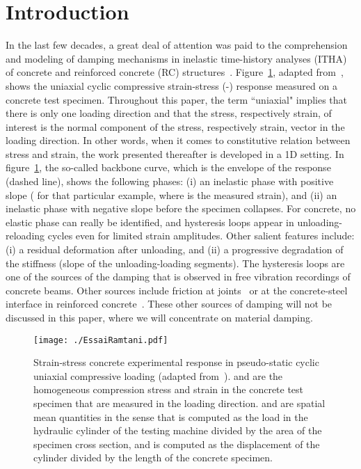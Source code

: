 \documentclass[12p]{amsart}
\begin{document}
\section{Introduction}
In the last few decades, a great deal of attention was paid to the comprehension and modeling of damping mechanisms in inelastic time-history analyses (ITHA) of concrete and reinforced concrete (RC) structures~\cite[section 2.4]{PEER/ATC-72-1}. Figure~\ref{fig:EssaiRamtani}, adapted from~\cite{Ramtani1990}, shows the uniaxial cyclic compressive strain-stress (-) response measured on a concrete test specimen. Throughout this paper, the term ``uniaxial" implies that there is only one loading direction and that the stress, respectively strain, of interest is the normal component of the stress, respectively strain, vector in the loading direction. In other words, when it comes to constitutive relation between stress and strain, the work presented thereafter is developed in a 1D setting. In figure~\ref{fig:EssaiRamtani}, the so-called backbone curve, which is the envelope of the response (dashed line), shows the following phases: (i) an inelastic phase with positive slope ( for that particular example, where  is the measured strain), and (ii) an inelastic phase with negative slope before the specimen collapses. For concrete, no elastic phase can really be identified, and hysteresis loops appear in unloading-reloading cycles even for limited strain amplitudes. Other salient features include: (i) a residual deformation after unloading, and (ii) a progressive degradation of the stiffness (slope of the unloading-loading segments). The hysteresis loops are one of the sources of the damping that is observed in free vibration recordings of concrete beams. Other sources include friction at joints~\cite{LesBac2007} or at the concrete-steel interface in reinforced concrete~\cite{DomIbr2012}. These other sources of damping will not be discussed in this paper, where we will concentrate on material damping.
\begin{figure}[htb]
\begin{center}
 \texttt{[image: ./EssaiRamtani.pdf]}
\caption{Strain-stress concrete experimental response in pseudo-static cyclic uniaxial compressive loading (adapted from~\cite{Ramtani1990}).  and  are the homogeneous compression stress and strain in the concrete test specimen that are measured in the loading direction.  and  are spatial mean quantities in the sense that  is computed as the load in the hydraulic cylinder of the testing machine divided by the area of the specimen cross section, and  is computed as the displacement of the cylinder divided by the length of the concrete specimen.}
\label{fig:EssaiRamtani}
\end{center}
\end{figure}
\end{document}
